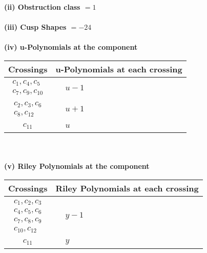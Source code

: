 \documentclass[1p]{elsarticle_modified}
\theoremstyle{definition}
\begin{document}
\flushleft \textbf{(ii) Obstruction class $= 1$}\\~\\
\flushleft \textbf{(iii) Cusp Shapes $= -24$}\\~\\
\newpage\renewcommand{\arraystretch}{1}
\flushleft \textbf{(iv) u-Polynomials at the component}\newline \\
\begin{tabular}{m{50pt}|m{274pt}}
Crossings & \hspace{64pt}u-Polynomials at each crossing \\
\hline $$\begin{aligned}c_{1},c_{4},c_{5}\\c_{7},c_{9},c_{10}\end{aligned}$$&$\begin{aligned}
&u-1
\end{aligned}$\\
\hline $$\begin{aligned}c_{2},c_{3},c_{6}\\c_{8},c_{12}\end{aligned}$$&$\begin{aligned}
&u+1
\end{aligned}$\\
\hline $$\begin{aligned}c_{11}\end{aligned}$$&$\begin{aligned}
&u
\end{aligned}$\\
\hline
\end{tabular}\\~\\
\newpage\renewcommand{\arraystretch}{1}
\flushleft \textbf{(v) Riley Polynomials at the component}\newline \\
\begin{tabular}{m{50pt}|m{274pt}}
Crossings & \hspace{64pt}Riley Polynomials at each crossing \\
\hline $$\begin{aligned}c_{1},c_{2},c_{3}\\c_{4},c_{5},c_{6}\\c_{7},c_{8},c_{9}\\c_{10},c_{12}\end{aligned}$$&$\begin{aligned}
&y-1
\end{aligned}$\\
\hline $$\begin{aligned}c_{11}\end{aligned}$$&$\begin{aligned}
&y
\end{aligned}$\\
\hline
\end{tabular}\\~\\
\end{document}
